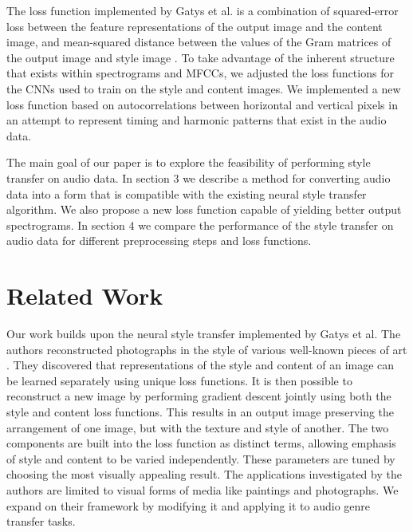 \documentclass{article}
\begin{document}
The loss function implemented by Gatys et al. is a combination of squared-error loss between the feature representations of the output image and the content image, and mean-squared distance between the values of the Gram matrices of the output image and style image \citep{Gatys2015}. To take advantage of the inherent structure that exists within spectrograms and MFCCs, we adjusted the loss functions for the CNNs used to train on the style and content images. We implemented a new loss function based on autocorrelations between horizontal and vertical pixels in an attempt to represent timing and harmonic patterns that exist in the audio data.

The main goal of our paper is to explore the feasibility of performing style transfer on audio data. In section 3 we describe a method for converting audio data into a form that is compatible with the existing neural style transfer algorithm. We also propose a new loss function capable of yielding better output spectrograms. In section 4 we compare the performance of the style transfer on audio data for different preprocessing steps and loss functions.


\section{Related Work}

Our work builds upon the neural style transfer implemented by Gatys et al. The authors reconstructed photographs in the style of various well-known pieces of art \citep{Gatys2015}. They discovered that representations of the style and content of an image can be learned separately using unique loss functions. It is then possible to reconstruct a new image by performing gradient descent jointly using both the style and content loss functions. This results in an output image preserving the arrangement of one image, but with the texture and style of another. The two components are built into the loss function as distinct terms, allowing emphasis of style and content to be varied independently. These parameters are tuned by choosing the most visually appealing result. The applications investigated by the authors are limited to visual forms of media like paintings and photographs. We expand on their framework by modifying it and applying it to audio genre transfer tasks.
\end{document}
